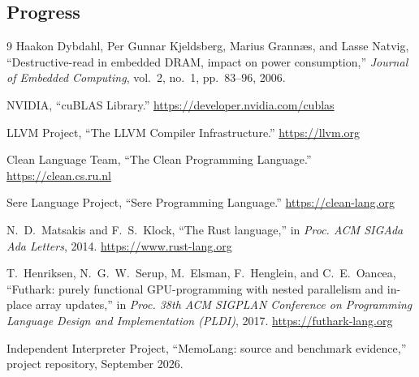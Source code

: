 \documentclass[a4paper]{article}
\begin{document}
	
	\subsection{Progress}
	
	
	\begin{thebibliography}{9}
		Haakon Dybdahl, Per Gunnar Kjeldsberg, Marius Grann{\ae}s, and Lasse Natvig,
		``Destructive-read in embedded DRAM, impact on power consumption,''
		\emph{Journal of Embedded Computing}, vol.~2, no.~1, pp.~83--96, 2006.
		
		NVIDIA, ``cuBLAS Library.'' \url{https://developer.nvidia.com/cublas}
		
		LLVM Project, ``The LLVM Compiler Infrastructure.'' \url{https://llvm.org}
		
		Clean Language Team, ``The Clean Programming Language.'' \url{https://clean.cs.ru.nl}
		
		Sere Language Project, ``Sere Programming Language.'' \url{https://clean-lang.org}
		
		N.~D.~Matsakis and F.~S.~Klock, ``The Rust language,'' in \emph{Proc. ACM SIGAda Ada Letters}, 2014. \url{https://www.rust-lang.org}
		
		T.~Henriksen, N.~G.~W.~Serup, M.~Elsman, F.~Henglein, and C.~E.~Oancea, ``Futhark: purely functional GPU-programming with nested parallelism and in-place array updates,'' in \emph{Proc. 38th ACM SIGPLAN Conference on Programming Language Design and Implementation (PLDI)}, 2017. \url{https://futhark-lang.org}
		
		Independent Interpreter Project, ``MemoLang: source and benchmark evidence,'' project repository, September 2026.
		
	\end{thebibliography}
	
\end{document}
